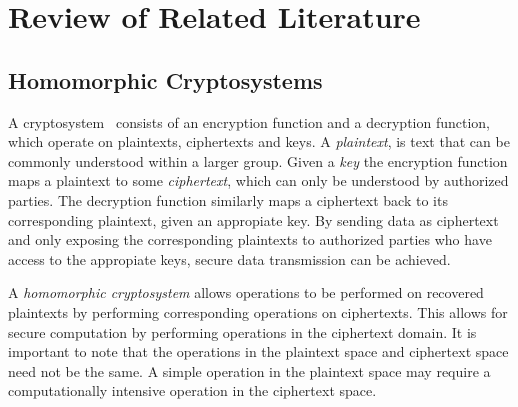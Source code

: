 \section{Review of Related Literature}
\label{sec:chapter_2}
\subsection{Homomorphic Cryptosystems}
A cryptosystem~\cite{bauer_cryptosystem_2005} consists of an encryption function and a decryption function, which operate on plaintexts, ciphertexts and keys. A \textit{plaintext}, is text that can be commonly understood within a larger group. Given a \textit{key} the encryption function maps a plaintext to some \textit{ciphertext}, which can only be understood by authorized parties. The decryption function similarly maps a ciphertext back to its corresponding plaintext, given an appropiate key. By sending data as ciphertext and only exposing the corresponding plaintexts to authorized parties who have access to the appropiate keys, secure data transmission can be achieved.

A \textit{homomorphic cryptosystem} allows operations to be performed on recovered plaintexts by performing corresponding operations on ciphertexts. This allows for secure computation by performing operations in the ciphertext domain. It is important to note that the operations in the plaintext space and ciphertext space need not be the same. A simple operation in the plaintext space may require a computationally intensive operation in the ciphertext space.


